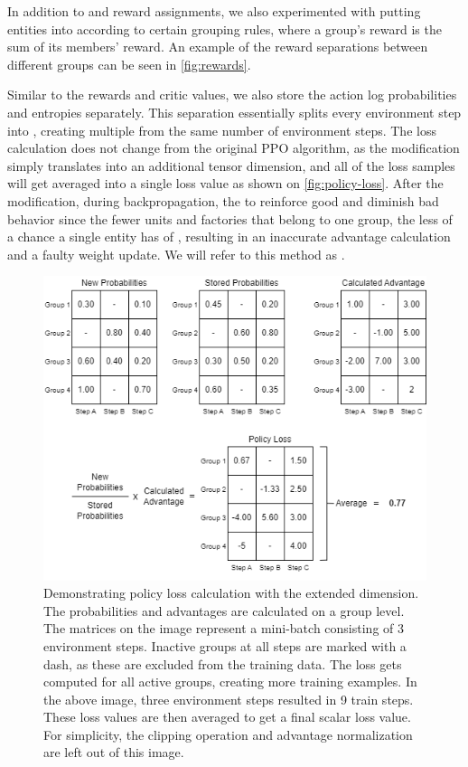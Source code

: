 \bigskip

\noindent In addition to  and  reward assignments, we also experimented with putting entities into  according to certain grouping rules, where a group's reward is the sum of its members' reward. An example of the reward separations between different groups can be seen in \autoref{fig:rewards}.

\bigskip

\noindent Similar to the rewards and critic values, we also store the action log probabilities and entropies separately. This separation essentially splits every environment step into , creating multiple  from the same number of environment steps. The loss calculation does not change from the original PPO algorithm, as the modification simply translates into an additional tensor dimension, and all of the loss samples will get averaged into a single loss value as shown on \autoref{fig:policy-loss}. After the modification, during backpropagation, the  to reinforce good and diminish bad behavior since the fewer units and factories that belong to one group, the less of a chance a single entity has of , resulting in an inaccurate advantage calculation and a faulty weight update. We will refer to this method as .

\begin{figure}[htbp]
    \centering
    \includegraphics[width=0.7\linewidth]{images/methods_hybrid/trajectory_separation/policy_loss.png}
    \captionsetup{justification=justified, singlelinecheck=false, width=1\linewidth, labelfont=bf} 
    \caption[]{Demonstrating policy loss calculation with the extended dimension. The probabilities and advantages are calculated on a group level. The matrices on the image represent a mini-batch consisting of 3 environment steps. Inactive groups at all steps are marked with a dash, as these are excluded from the training data. The loss gets computed for all active groups, creating more training examples. In the above image, three environment steps resulted in 9 train steps. These loss values are then averaged to get a final scalar loss value. For simplicity, the clipping operation and advantage normalization are left out of this image.}
    \label{fig:policy-loss}
\end{figure}


